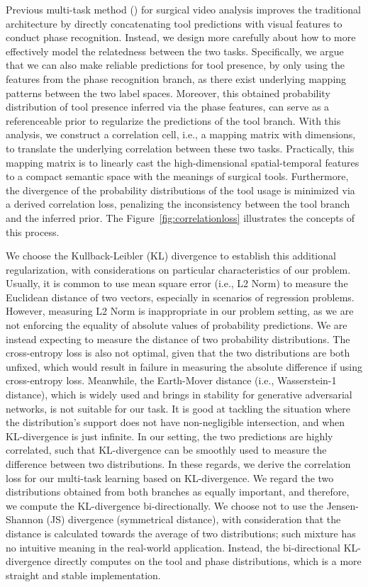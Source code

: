 \documentclass{elsarticle}
\begin{document}
Previous multi-task method (\cite{twinanda2017endonet}) for surgical video analysis improves the traditional architecture by directly concatenating tool predictions with visual features to conduct phase recognition.
Instead, we design more carefully about how to more effectively model the relatedness between the two tasks.
Specifically, we argue that we can also make reliable predictions for tool presence, by only using the features from the phase recognition branch, as there exist underlying mapping patterns between the two label spaces.
Moreover, this obtained probability distribution of tool presence inferred via the phase features, can serve as a referenceable prior to regularize the predictions of the tool branch.
With this analysis, we construct a correlation cell, i.e., a mapping matrix with  dimensions, to translate the underlying correlation between these two tasks. 
Practically, this mapping matrix is to linearly cast the high-dimensional spatial-temporal features to a compact semantic space with the meanings of surgical tools. 
Furthermore, the divergence of the probability distributions of the tool usage is minimized via a derived correlation loss,
penalizing the inconsistency between the tool branch and the inferred prior.
The Figure~\ref{fig:correlationloss} illustrates the concepts of this process.


We choose the Kullback-Leibler (KL) divergence to establish this additional regularization, with considerations on particular characteristics of our problem.
Usually, it is common to use mean square error (i.e., L2 Norm) to measure the Euclidean distance of two vectors, especially in scenarios of regression problems. However, measuring L2 Norm is inappropriate in our problem setting, as we are not enforcing the equality of absolute values of probability predictions.
We are instead expecting to measure the distance of two probability distributions.
The cross-entropy loss is also not optimal, given that the two distributions are both unfixed, which would result in failure in measuring the absolute difference if using cross-entropy loss.
Meanwhile, the Earth-Mover distance (i.e., Wasserstein-1 distance), which is widely used and brings in stability for generative adversarial networks, is not suitable for our task. 
It is good at tackling the situation where the distribution's support does not have non-negligible intersection, and when KL-divergence is just infinite.
In our setting, the two predictions are highly correlated, such that KL-divergence can be smoothly used to measure the difference between two distributions.
In these regards, we derive the correlation loss for our multi-task learning based on KL-divergence.
We regard the two distributions obtained from both branches as equally important, and therefore, we compute the KL-divergence bi-directionally.
We choose not to use the Jensen-Shannon (JS) divergence (symmetrical distance), with consideration that the distance is calculated towards the average of two distributions; such mixture has no intuitive meaning in the real-world application.
Instead, the bi-directional KL-divergence directly computes on the tool and phase distributions, which is a more straight and stable implementation.
\end{document}
